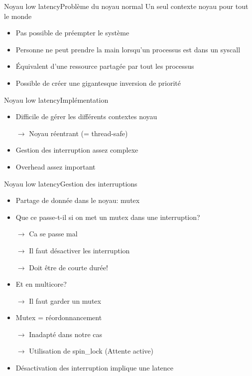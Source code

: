\begin{frame}{Noyau low latency}{Problème du noyau normal} %
  Un seul contexte noyau pour tout le monde
  \begin{itemize}
  \item Pas possible de préempter le système
  \item Personne ne peut prendre  la main lorsqu'un processus est dans
    un syscall
  \item Équivalent d'une ressource partagée par tout les processus
  \item Possible de créer une gigantesque inversion de priorité
  \end{itemize}
\end{frame}

\begin{frame}{Noyau low latency}{Implémentation} %
  \begin{itemize}
  \item Difficile de gérer les différents contextes noyau
  \item[$\to$] Noyau réentrant (= thread-safe)
  \item Gestion des interruption assez complexe
  \item Overhead assez important
  \end{itemize}
\end{frame}

\begin{frame}{Noyau low latency}{Gestion des interruptions} %
 \begin{itemize}
   \item Partage de donnée dans le noyau: mutex
   \item Que ce passe-t-il si on met un mutex dans une interruption?
   \item[$\to$] Ca se passe mal %
   \item[$\to$] Il faut désactiver les interruption
   \item[$\to$] Doit être de courte durée!
   \item Et en multicore? 
   \item[$\to$] Il faut garder un mutex
   \item Mutex = réordonnancement 
   \item[$\to$] Inadapté dans notre cas
   \item[$\to$] Utilisation de spin\_lock (Attente active)
   \item Désactivation des interruption implique une latence
 \end{itemize}
\end{frame}


